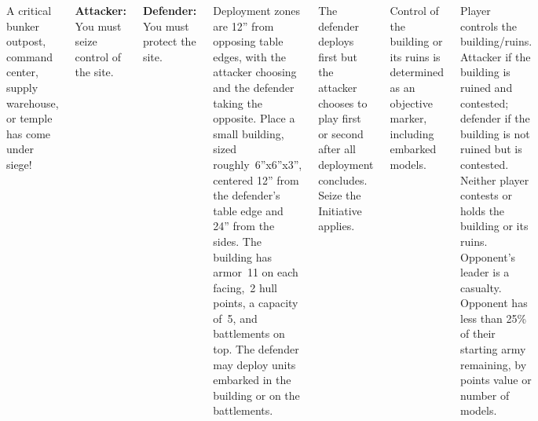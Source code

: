 
\begin{columns}

  A critical bunker outpost, command center, supply warehouse, or
  temple has come under siege!

{\bf Attacker:} You must seize control of the site.

{\bf Defender:} You must protect the site.

%

Deployment zones are 12'' from opposing table edges, with the attacker
choosing and the defender taking the opposite.  Place a small
building, sized roughly~6''x6''x3'', centered 12'' from the defender's
table edge and 24'' from the sides.  The building has armor~11 on each
facing,~2 hull points, a capacity of~5, and battlements on top.  The
defender may deploy units embarked in the building or on the
battlements.

%

The defender deploys first but the attacker chooses to play first or
second after all deployment concludes.  Seize the Initiative applies.

Control of the building or its ruins is determined as an objective
marker, including embarked models.

\columnbreak

\scoringbox%
{Player controls the building/ruins.}%
{Attacker if the building is ruined and contested; defender if the
  building is not ruined but is contested.}%
{Neither player contests or holds the building or its ruins.}%
{Opponent's leader is a casualty.}%
{Opponent has less than 25\% of their starting army remaining, by
  points value or number of models.}

\end{columns}
